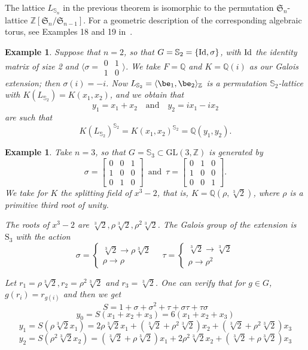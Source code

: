 \documentclass[12pt]{article}
\theoremstyle{plain}
\newtheorem{example}[theorem]{Example}
\newcommand{\Z}{\ensuremath{\mathbb{Z}}}
\newcommand{\Q}{\ensuremath{\mathbb{Q}}}
\begin{document}
The lattice $L_{\mathbb{S}_n}$ in the previous theorem is isomorphic
to the permutation $\mathfrak{S}_n$-lattice
$\Z[\mathfrak{S}_n/\mathfrak{S}_{n-1}]$. For a geometric description of
the corresponding algebraic torus, see Examples 18 and 19
in~\cite{Voskresenskii}.

\begin{example}	
Suppose that $n=2$, so that $G=\mathbb{S}_2 =\{ {\rm Id}, \sigma \}$,
with ${\rm Id}$ the identity matrix of size 2 and $\langle \sigma
= \begin{smallmatrix} 0&1\\ 1&0
\end{smallmatrix}\rangle$. We  take $F = \Q$ and $K = \Q(i)$ as our Galois 
extension; then $\sigma(i) = -i$. Now $L_{\mathbb{S}_2} = \langle \be_1,\be_2
\rangle_{\Z}$ is a permutation ${\mathbb{S}_2}$-lattice with $K(L_{\mathbb{S}_2}) = K(x_1,x_2)$,
and we obtain that $$y_1 = x_1+x_2\quad \textrm{and}\quad y_2 = ix_1
-ix_2 $$ are such that $$K(L_{\mathbb{S}_2})^{\mathbb{S}_2} = K(x_1,x_2)^{\mathbb{S}_2} = \Q(y_1,y_2).$$
\end{example}

\begin{example}
Take $n=3$, so that $G=\mathbb{S}_3 \subset \mathrm{GL}(3,\Z)$ is
generated by $$\sigma = \begin{bmatrix} 0 & 0 &1\\ 1 & 0 &0\\ 0 & 1 &
  0
\end{bmatrix}\,\,\, \text{and} \,\,\, \tau = \begin{bmatrix}
0 & 1 &0\\
1 & 0 &0\\
0 & 0 & 1
\end{bmatrix}.$$
We take for $K$ the splitting field of $x^3-2$, that is, $K=\Q(\rho,
\sqrt[3]{2})$, where $\rho$ is a primitive third root of unity.

The roots of $x^3-2$ are $\sqrt[3]{2},\rho \sqrt[3]{2}, \rho^2 \sqrt[3]{2}$. The Galois group of the extension is $\mathrm{S}_3$ with the action $$\sigma = \begin{cases} \sqrt[3]{2}\longrightarrow \rho \sqrt[3]{2} \\ \rho \longrightarrow \rho \end{cases}\,\,\, \,\,\,\tau = \begin{cases} \sqrt[3]{2}\longrightarrow \sqrt[3]{2} \\ \rho \longrightarrow \rho^2 \end{cases}$$

Let $r_1 = \rho \sqrt[3]{2}, r_2 = \rho^2 \sqrt[3]{2}$ and $r_3 = \sqrt[3]{2}$. One can verify that for $g \in G$, $g(r_i) = r_{g(i)}$ and then we get
 $$S= 1+\sigma +\sigma^2 +\tau +\sigma \tau +\tau \sigma $$
 $$y_0 = S(x_1+ x_2 + x_3)= 6(x_1+x_2+x_3)$$
 $$ y_1 = S(\rho \sqrt[3]{2} x_1) = 2\rho\sqrt[3]{2}x_1+(\sqrt[3]{2}+\rho^2 \sqrt[3]{2})x_2 + (\sqrt[3]{2}+\rho^2 \sqrt[3]{2})x_3 $$
 $$ y_2 = S(\rho^2\sqrt[3]{2}x_2) = (\sqrt[3]{2}+\rho \sqrt[3]{2})x_1 + 2\rho^2\sqrt[3]{2}x_2 + (\sqrt[3]{2}+\rho \sqrt[3]{2})x_3$$
 \end{example}
\end{document}
